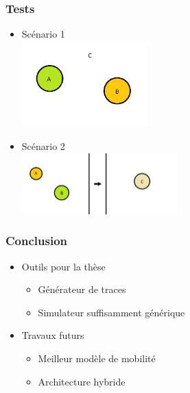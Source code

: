 \documentclass{beamer}
\begin{document}
\begin{frame}
  \frametitle{Tests}
  \begin{itemize}
    \item{Scénario 1\\[1mm]\includegraphics[width=5cm]{scenario_1.png}}
    \item{Scénario 2\\[1mm]\includegraphics[width=6cm]{scenario_2.png}}
  \end{itemize}
\end{frame}

\begin{frame}
  \frametitle{Conclusion}
  \begin{itemize}
  \item{Outils pour la thèse}
    \begin{itemize}
      \item{Générateur de traces}
      \item{Simulateur suffisamment générique\vspace{0.8cm}}
    \end{itemize}
    \item{Travaux futurs}
    \begin{itemize}
      \item{Meilleur modèle de mobilité}
      \item{Architecture hybride}
    \end{itemize}
  \end{itemize}
\end{frame}

\end{document}
